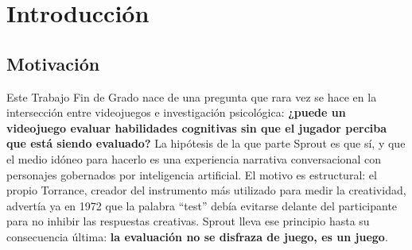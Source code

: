 \documentclass[12pt,twoside,titlepage]{report}
\begin{document}

\pagestyle{fancy}

\renewcommand{\chaptermark}[1]{\markboth{Capítulo \thechapter.\ #1}{}}

\pagestyle{fancy}
\fancyhf{}
\fancyhead[LO]{\leftmark}
\fancyhead[RO]{}
\fancyhead[RE]{\nouppercase\rightmark}
\fancyhead[LE]{}
\fancyfoot[C]{\thepage}



\chapter{Introducción}


\pagestyle{fancy}

\setlength{\parskip}{0.75em}
\renewcommand{\baselinestretch}{1.25}
\setcounter{page}{1}


\section{Motivación}

Este Trabajo Fin de Grado nace de una pregunta que rara vez se hace en la intersección entre videojuegos e investigación psicológica: \textbf{¿puede un videojuego evaluar habilidades cognitivas sin que el jugador perciba que está siendo evaluado?} La hipótesis de la que parte Sprout es que sí, y que el medio idóneo para hacerlo es una experiencia narrativa conversacional con personajes gobernados por inteligencia artificial. El motivo es estructural: el propio Torrance, creador del instrumento más utilizado para medir la creatividad, advertía ya en 1972 que la palabra ``test'' debía evitarse delante del participante para no inhibir las respuestas creativas. Sprout lleva ese principio hasta su consecuencia última: \textbf{la evaluación no se disfraza de juego, es un juego}.
\end{document}
